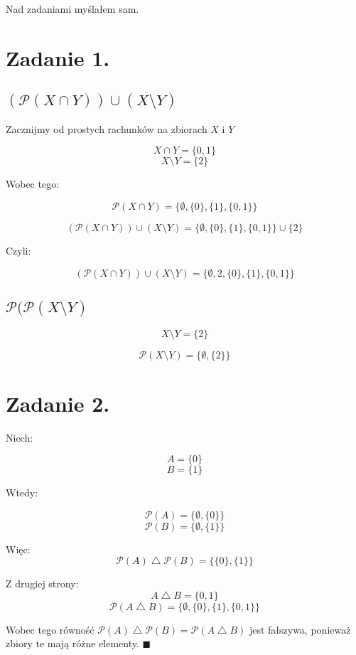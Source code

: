 \documentclass{article}
\begin{document}
\newcommand{\imp}{\Rightarrow}
\newcommand{\lub}{\vee}
\newcommand{\roz}{\setminus}
\newcommand{\zbp}{\emptyset}
\newcommand{\zbpot}{\mathcal{P}}
\newcommand{\troj}{\bigtriangleup}

\maketitle
Nad zadaniami myślałem sam.
\section*{Zadanie 1.}

\subsection*{$(\zbpot ( X \cap Y)) \cup (X \roz Y)$}
Zacznijmy od prostych rachunków na zbiorach $X$ i $Y$

\[X\cap Y = \{0,1\}\]
\[X\roz Y = \{2\}\]

Wobec tego:

\[\zbpot ( X \cap Y) = \{\zbp, \{0\}, \{1\}, \{0,1\}\} \]

\[(\zbpot ( X \cap Y)) \cup (X \roz Y) = \{\zbp, \{0\}, \{1\}, \{0,1\}\} \cup \{2\} \]

Czyli:

\[(\zbpot ( X \cap Y)) \cup (X \roz Y) = \{\zbp, 2, \{0\}, \{1\}, \{0,1\}\}  \]

\subsection*{$\zbpot (\zbpot(X\roz Y)$}

\[X\roz Y = \{2\}\]

\[\zbpot (X\roz Y) = \{\zbp,\{2\}\}\]


\section*{Zadanie 2.}

Niech:

\[A = \{0\}\]
\[B = \{1\}\]

Wtedy:

\[\zbpot (A) = \{\zbp,\{0\}\}\]
\[\zbpot (B) = \{\zbp,\{1\}\}\]

Więc:
\[ \zbpot (A) \troj \zbpot (B) = \{\{0\},\{1\}\} \]

Z drugiej strony:
\[A \troj B = \{0,1\}\]
\[\zbpot (A\troj B) = \{\zbp,\{0\},\{1\},\{0,1\}\}\]

Wobec tego równość $ \zbpot (A) \troj \zbpot (B) = \zbpot (A\troj B) $ jest fałszywa, ponieważ zbiory te mają różne elementy. $\blacksquare$
\end{document}
